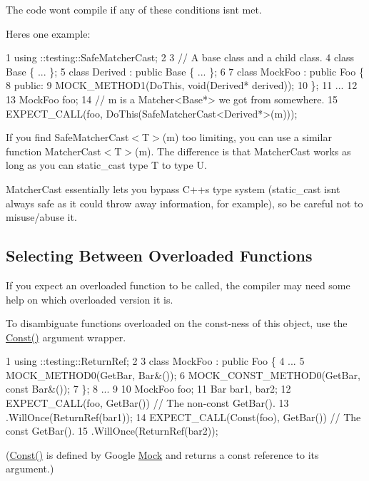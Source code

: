 The code won\textquotesingle{}t compile if any of these conditions isn\textquotesingle{}t met.

Here\textquotesingle{}s one example\+:


\begin{DoxyCode}
1 using ::testing::SafeMatcherCast;
2 
3 // A base class and a child class.
4 class Base \{ ... \};
5 class Derived : public Base \{ ... \};
6 
7 class MockFoo : public Foo \{
8  public:
9   MOCK\_METHOD1(DoThis, void(Derived* derived));
10 \};
11 ...
12 
13   MockFoo foo;
14   // m is a Matcher<Base*> we got from somewhere.
15   EXPECT\_CALL(foo, DoThis(SafeMatcherCast<Derived*>(m)));
\end{DoxyCode}


If you find {\ttfamily Safe\+Matcher\+Cast$<$T$>$(m)} too limiting, you can use a similar function {\ttfamily Matcher\+Cast$<$T$>$(m)}. The difference is that {\ttfamily Matcher\+Cast} works as long as you can {\ttfamily static\+\_\+cast} type {\ttfamily T} to type {\ttfamily U}.

{\ttfamily Matcher\+Cast} essentially lets you bypass C++\textquotesingle{}s type system ({\ttfamily static\+\_\+cast} isn\textquotesingle{}t always safe as it could throw away information, for example), so be careful not to misuse/abuse it.

\subsection*{Selecting Between Overloaded Functions}

If you expect an overloaded function to be called, the compiler may need some help on which overloaded version it is.

To disambiguate functions overloaded on the const-\/ness of this object, use the {\ttfamily \hyperlink{namespacetesting_a945ac56c5508a3c9c032bbe8aae8dcfa}{Const()}} argument wrapper.


\begin{DoxyCode}
1 using ::testing::ReturnRef;
2 
3 class MockFoo : public Foo \{
4   ...
5   MOCK\_METHOD0(GetBar, Bar&());
6   MOCK\_CONST\_METHOD0(GetBar, const Bar&());
7 \};
8 ...
9 
10   MockFoo foo;
11   Bar bar1, bar2;
12   EXPECT\_CALL(foo, GetBar())         // The non-const GetBar().
13       .WillOnce(ReturnRef(bar1));
14   EXPECT\_CALL(Const(foo), GetBar())  // The const GetBar().
15       .WillOnce(ReturnRef(bar2));
\end{DoxyCode}


({\ttfamily \hyperlink{namespacetesting_a945ac56c5508a3c9c032bbe8aae8dcfa}{Const()}} is defined by Google \hyperlink{classMock}{Mock} and returns a {\ttfamily const} reference to its argument.)

